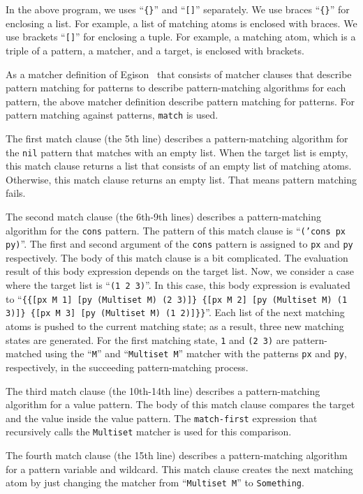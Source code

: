 \documentclass[acmlarge]{acmart}
\begin{document}
In the above program, we uses ``\texttt{\{\}}'' and ``\texttt{[]}'' separately.
We use braces ``\texttt{\{\}}'' for enclosing a list.
For example, a list of matching atoms is enclosed with braces.
We use brackets ``\texttt{[]}'' for enclosing a tuple.
For example, a matching atom, which is a triple of a pattern, a matcher, and a target, is enclosed with brackets.

As a matcher definition of Egison~\cite{egi2018aplas} that consists of matcher clauses that describe pattern matching for patterns to describe pattern-matching algorithms for each pattern, the above matcher definition describe pattern matching for patterns.
For pattern matching against patterns, \texttt{match} is used.

The first match clause (the 5th line) describes a pattern-matching algorithm for the \texttt{nil} pattern that matches with an empty list.
When the target list is empty, this match clause returns a list that consists of an empty list of matching atoms.
Otherwise, this match clause returns an empty list.
That means pattern matching fails.

The second match clause (the 6th-9th lines) describes a pattern-matching algorithm for the \texttt{cons} pattern.
The pattern of this match clause is  ``\texttt{('cons px py)}''.
The first and second argument of the \texttt{cons} pattern is assigned to \texttt{px} and \texttt{py} respectively.
The body of this match clause is a bit complicated.
The evaluation result of this body expression depends on the target list.
Now, we consider a case where the target list is ``\texttt{(1 2 3)}''.
In this case, this body expression is evaluated to ``\texttt{\{\{[px M 1] [py (Multiset M) (2 3)]\} \{[px M 2] [py (Multiset M) (1 3)]\} \{[px M 3] [py (Multiset M) (1 2)]\}\}}''.
Each list of the next matching atoms is pushed to the current matching state; as a result, three new matching states are generated.
For the first matching state, \texttt{1} and \texttt{(2 3)} are pattern-matched using the ``\texttt{M}'' and ``\texttt{Multiset M}'' matcher with the patterns \texttt{px} and \texttt{py}, respectively, in the succeeding pattern-matching process.

The third match clause (the 10th-14th line) describes a pattern-matching algorithm for a value pattern.
The body of this match clause compares the target and the value inside the value pattern.
The \texttt{match-first} expression that recursively calls the \texttt{Multiset} matcher is used for this comparison.

The fourth match clause (the 15th line) describes a pattern-matching algorithm for a pattern variable and wildcard.
This match clause creates the next matching atom by just changing the matcher from ``\texttt{Multiset M}'' to \texttt{Something}.
\end{document}
